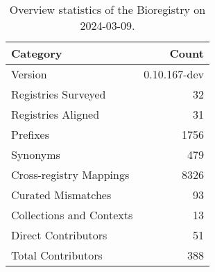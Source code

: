 \begin{table}
\caption{Overview statistics of the Bioregistry on 2024-03-09.}
\label{tab:bioregistry-summary}
\begin{tabular}{lr}
\toprule
Category & Count \\
\midrule
Version & 0.10.167-dev \\
Registries Surveyed & 32 \\
Registries Aligned & 31 \\
Prefixes & 1756 \\
Synonyms & 479 \\
Cross-registry Mappings & 8326 \\
Curated Mismatches & 93 \\
Collections and Contexts & 13 \\
Direct Contributors & 51 \\
Total Contributors & 388 \\
\bottomrule
\end{tabular}
\end{table}
